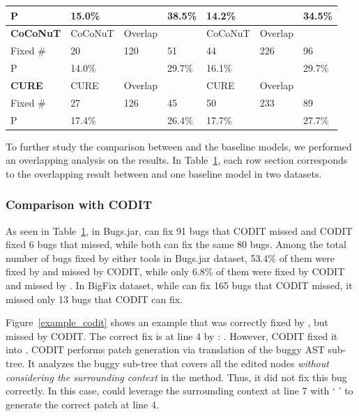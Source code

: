 {{\begin{table}[t]
\begin{center}
\begin{tabular}{p{1cm}<{\centering}|p{1.1cm}<{\centering}|p{0.8cm}<{\centering}|p{0.7cm}<{\centering}|p{1.1cm}<{\centering}|p{0.8cm}<{\centering}|p{0.7cm}<{\centering}}
			P            &  15.0\%  &    & 38.5\%  &  14.2\%  &    &  34.5\%\\
			\hline
			{\bf CoCoNuT}             & CoCoNuT   & Overlap   & \tool  & CoCoNuT   & Overlap   & \tool \\
			\hline
			Fixed \#     & \cellcolor{mygray} 20  & 120   & \cellcolor{mygray} 51 & \cellcolor{mygray}44 &  226  & \cellcolor{mygray} 96\\
			P            &  14.0\%  &    &  29.7\% &  16.1\%  &    & 29.7\% \\
			\hline
			{\bf CURE}             & CURE   & Overlap   & \tool  & CURE   & Overlap   & \tool \\
			\hline
			Fixed \#     & \cellcolor{mygray} 27  &  126  & \cellcolor{mygray} 45 & \cellcolor{mygray} 50&  233  & \cellcolor{mygray} 89\\
			P            &  17.4\%  &    & 26.4\%  & 17.7\%   &    &  27.7\%\\
			\hline
		\end{tabular}
		\label{RQ3_results}
	\end{center}
\end{table}
}}

To further study the comparison between {\tool} and the baseline
models, we performed an overlapping analysis on the results.  In
Table~\ref{RQ3_results}, each row section corresponds to the
overlapping result between {\tool} and one baseline model
in two datasets.

\subsubsection{{\bf Comparison with CODIT}}

As seen in Table~\ref{RQ3_results}, in Bugs.jar, {\tool} can fix 91
bugs that CODIT missed and CODIT fixed 6 bugs that {\tool} missed,
while both can fix the same 80 bugs. Among the total number of bugs
fixed by either tools in Bugs.jar dataset, 53.4\% of them were fixed by
{\tool} and missed by CODIT, while only 6.8\% of them were fixed by
CODIT and missed by {\tool}. In BigFix dataset, while {\tool} can fix
165 bugs that CODIT missed, it missed only 13 bugs that CODIT can fix.



Figure~\ref{example_codit} shows an example that was correctly fixed
by {\tool}, but missed by CODIT. The correct fix is at line 4 by
{\tool}:    
.  However, CODIT fixed it into 
 .
CODIT performs patch generation via translation of the buggy AST
sub-tree. It analyzes the buggy sub-tree that covers all the edited
nodes {\em without considering the surrounding context} in the method.
Thus, it did not fix this bug correctly. In this case, {\tool} could
leverage the surrounding context at line 7 with
`  ' to
generate the correct patch at line 4.

